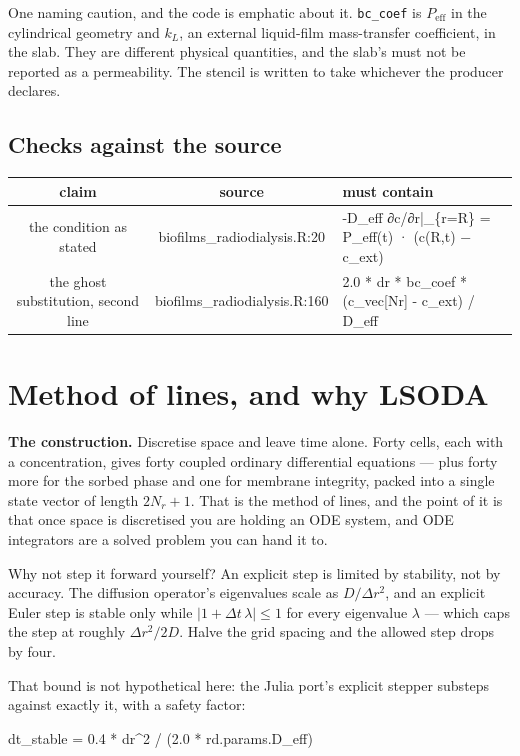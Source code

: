 \documentclass[11pt]{article}
\newcommand{\us}{\_\allowbreak}
\newcommand{\checkhead}{%
  \toprule
  \textbf{\normalsize claim} & \textbf{\normalsize source} & \textbf{\normalsize must contain} \\
  \midrule
}
\begin{document}
One naming caution, and the code is emphatic about it. \texttt{bc\_coef} is
$P_{\text{eff}}$ in the cylindrical geometry and $k_L$, an external liquid-film mass-transfer
coefficient, in the slab. They are different physical quantities, and the slab's must not be
reported as a permeability. The stencil is written to take whichever the producer declares.

\subsection*{Checks against the source}

\begin{longtable}{CSF}
\checkhead
\endhead
the condition as stated
  & biofilms\us radiodialysis.R:20
  & -D\_eff ∂c/∂r|\_\{r=R\} = P\_eff(t) · (c(R,t) − c\_ext) \\[0.35em]
the ghost substitution, second line
  & biofilms\us radiodialysis.R:160
  & 2.0 * dr * bc\_coef * (c\_vec[Nr] - c\_ext) / D\_eff \\
\bottomrule
\end{longtable}

\section{Method of lines, and why LSODA}

\textbf{The construction.} Discretise space and leave time alone. Forty cells, each with a
concentration, gives forty coupled ordinary differential equations — plus forty more for the
sorbed phase and one for membrane integrity, packed into a single state vector of length
$2N_r + 1$. That is the method of lines, and the point of it is that once space is
discretised you are holding an ODE system, and ODE integrators are a solved problem you can
hand it to.

Why not step it forward yourself? An explicit step is limited by stability, not
by accuracy. The diffusion operator's eigenvalues scale as $D/\Delta r^2$, and an explicit
Euler step is stable only while $|1 + \Delta t\,\lambda| \le 1$ for every eigenvalue
$\lambda$ — which caps the step at roughly $\Delta r^2/2D$. Halve the grid spacing and the
allowed step drops by four.

That bound is not hypothetical here: the Julia port's explicit stepper substeps against
exactly it, with a safety factor:

\begin{code}
dt_stable = 0.4 * dr^2 / (2.0 * rd.params.D_eff)
\end{code}
\end{document}
